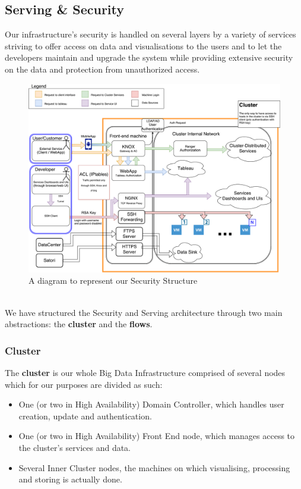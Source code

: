\subsection{Serving \& Security}
Our infrastructure's security is handled on several layers by a variety of services striving to offer access on data and visualisations to the users and to let the developers maintain and upgrade the system while providing extensive security on the data and protection from unauthorized access.
\\
\begin{figure}
	\centering
	\includegraphics[scale=0.4]{Figures/SecurityStructureDiagram}
	\decoRule
	\caption[Security Structure Diagram]{A diagram to represent our Security Structure}
	\label{fig:SecurityStructureDiagram}
\end{figure}
\\
We have structured the Security and Serving architecture through two main abstractions: the \textbf{cluster} and the \textbf{flows}.
\subsubsection{Cluster}
The \textbf{cluster} is our whole Big Data Infrastructure comprised of several nodes which for our purposes are divided as such:
\begin{itemize}
	\item One (or two in High Availability) Domain Controller, which handles user creation, update and authentication.
	\item One (or two in High Availability) Front End node, which manages access to the cluster's services and data.
	\item Several Inner Cluster nodes, the machines on which visualising, processing and storing is actually done.
\end{itemize}

